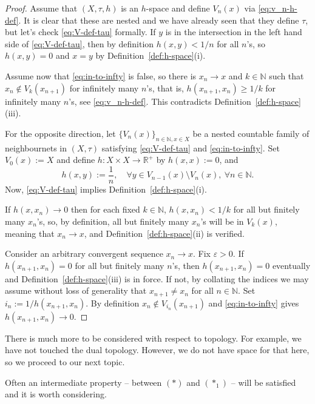 \documentclass[12pt]{article}
\newcommand{\astone}{(\ast_1)}
\begin{document}
\begin{proof}
    Assume that $(X,\tau,h)$ is an $h$-space and define $V_n(x)$ via \eqref{eq:v_n-h-def}. It is clear that these are nested and we have already seen that they define $\tau$, but let's check \eqref{eq:V-def-tau} formally. If $y$ is in the intersection in the left hand side of \eqref{eq:V-def-tau}, then by definition $h(x,y) < 1/n$ for all $n$'s, so $h(x,y)=0$ and $x=y$ by Definition~\ref{def:h-space}(i).

       Assume now that \eqref{eq:in-to-infty} is false, so there is $x_n\to x$ and $k\in\mathbb{N}$ such that $x_n\notin V_k(x_{n+1})$ for infinitely many $n$'s, that is, $h(x_{n+1},x_n)\ge 1/k$ for infinitely many $n$'s, see \eqref{eq:v_n-h-def}. This contradicts Definition~\ref{def:h-space}(iii).

    For the opposite direction, let $\{V_n(x)\}_{n\in\mathbb{N}, x\in X}$ be a nested countable family of neighbournets in $(X,\tau)$ satisfying \eqref{eq:V-def-tau} and \eqref{eq:in-to-infty}. Set $V_0(x) := X$ and define $h:X\times X\to\mathbb{R}^+$ by $h(x,x):=0$, and
    $$
        h(x,y) := \frac{1}{n},\quad\forall y \in V_{n-1}(x)\setminus V_n(x),\ \forall n\in\mathbb{N}.
    $$
    Now, \eqref{eq:V-def-tau} implies  Definition~\ref{def:h-space}(i).

    If $h(x,x_n)\to 0$ then for each fixed $k\in\mathbb{N}$,  $h(x,x_n)<1/k$ for all but finitely many $x_n$'s, so, by definition,  all but finitely many $x_n$'s will be in $V_k(x)$, meaning that $x_n\to x$, and  Definition~\ref{def:h-space}(ii) is verified.


    Consider an arbitrary convergent sequence $x_n\to x$. Fix $\varepsilon > 0$. If $h(x_{n+1},x_n) = 0$
    for all but finitely many $n$'s, then $h(x_{n+1},x_n) = 0$ eventually and   Definition~\ref{def:h-space}(iii) is in force. If not, by collating the indices we may assume without loss of generality that $x_{n+1}\neq x_n$ for all $n\in\mathbb{N}$. Set $i_n :=1/h(x_{n+1},x_n)$. By definition  $x_n\notin V_{i_n}(x_{n+1})$ and \eqref{eq:in-to-infty} gives $h(x_{n+1},x_n)\to0$.
\end{proof}
There is much more to be considered with respect to topology. For example, we have not touched the dual topology. However,  we do not have space for that here, so we proceed to our next topic.

Often an intermediate property -- between $(\ast)$ and $\astone$ -- will be satisfied and it is worth considering.
\end{document}
